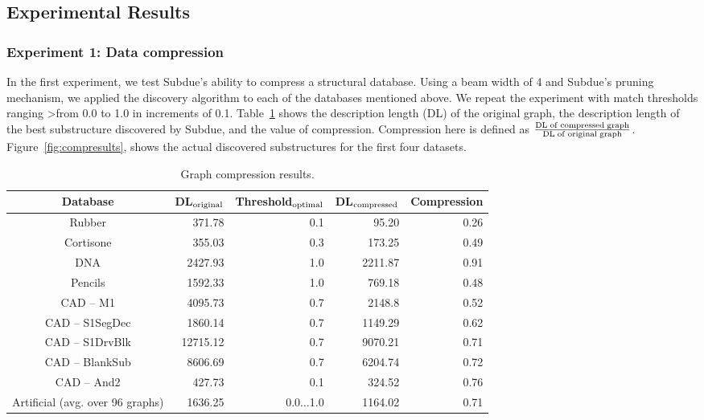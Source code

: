 \subsection{Experimental Results}
\label{s:experimentalresults}

\subsubsection{Experiment 1:  Data compression}

In the first experiment, we test {\sc Subdue}'s ability to
compress a structural database.  Using a beam width of 4 and {\sc Subdue}'s
pruning mechanism, we applied the discovery algorithm to each of the databases
mentioned above.  We repeat the experiment with match thresholds ranging
>from 0.0 to 1.0 in increments of 0.1.  Table~\ref{table:t1} shows the
description length (DL) of the
original graph, the description length of the best substructure discovered
by {\sc Subdue}, and the value of compression.  Compression here is defined as
\(\frac{\rm DL \; of \; compressed \; graph}{\rm DL \; of \; original
\; graph}\).
Figure~\ref{fig:compresults}, shows the actual discovered substructures for
the first four datasets.

\begin{table}
\begin{center}
\begin{tabular}{|c|r|r|r|r|} \hline
Database & \multicolumn{1}{|c|}{DL${}_{\rm original}$} &
	   \multicolumn{1}{|c|}{Threshold${}_{\rm optimal}$} &
           \multicolumn{1}{|c|}{DL${}_{\rm compressed}$} &
           \multicolumn{1}{|c|}{Compression} \\ \hline
Rubber & 371.78 & 0.1 & 95.20 & 0.26 \\
Cortisone & 355.03 & 0.3 & 173.25 & 0.49 \\
DNA & 2427.93 & 1.0 & 2211.87 & 0.91 \\
Pencils & 1592.33 & 1.0 & 769.18 & 0.48 \\
CAD -- M1 & 4095.73 & 0.7 & 2148.8 & 0.52 \\
CAD -- S1SegDec & 1860.14 & 0.7 & 1149.29 & 0.62 \\
CAD -- S1DrvBlk & 12715.12 & 0.7 & 9070.21 & 0.71 \\
CAD -- BlankSub & 8606.69 & 0.7 & 6204.74 & 0.72 \\
CAD -- And2 & 427.73 & 0.1 & 324.52 & 0.76 \\
Artificial (avg. over 96 graphs) & 1636.25 & 0.0$\ldots$1.0 &
    1164.02 & 0.71 \\ \hline
\end{tabular}
\caption{Graph compression results.}
\label{table:t1}
\end{center}
\end{table}

